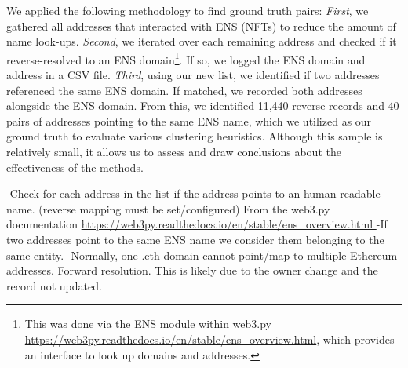 \documentclass[12pt,a4paper,titlepage,oneside,english]{article}
\begin{document}
We applied the following methodology to find ground truth pairs: \textit{First}, we gathered all addresses that interacted with ENS (NFTs) to reduce the amount of name look-ups. \textit{Second}, we iterated over each remaining address and checked if it reverse-resolved to an ENS domain\footnote{This was done via the ENS module within web3.py \url{https://web3py.readthedocs.io/en/stable/ens_overview.html}, which provides an interface to look up domains and addresses.}. If so, we logged the ENS domain and address in a CSV file. \textit{Third}, using our new list, we identified if two addresses referenced the same ENS domain. If matched, we recorded both addresses alongside the ENS domain. \newline
From this, we identified 11,440 reverse records and 40 pairs of addresses pointing to the same ENS name, which we utilized as our ground truth to evaluate various clustering heuristics. Although this sample is relatively small, it allows us to assess and draw conclusions about the effectiveness of the methods.%

\iffalse
-Check for each address in the list if the address points to an human-readable name. (reverse mapping must be set/configured) From the web3.py documentation \url{https://web3py.readthedocs.io/en/stable/ens_overview.html } %
-If two addresses point to the same ENS name we consider them belonging to the same entity. 
-Normally, one .eth domain cannot point/map to multiple Ethereum addresses. Forward resolution. This is likely due to the owner change and the record not updated.

\end{document}
